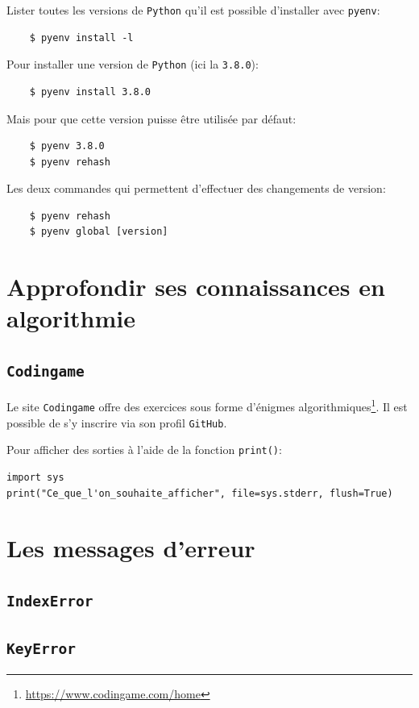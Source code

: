 \documentclass[a4paper,12pt]{book}
\begin{document}
Lister toutes les versions de \texttt{Python} qu'il est possible d'installer avec \texttt{pyenv}:
\begin{verbatim}
    $ pyenv install -l
\end{verbatim}
\medskip

Pour installer une version de \texttt{Python} (ici la \texttt{3.8.0}):
\begin{verbatim}
    $ pyenv install 3.8.0
\end{verbatim}
\medskip

Mais pour que cette version puisse être utilisée par défaut:
\begin{verbatim}
    $ pyenv 3.8.0
    $ pyenv rehash
\end{verbatim}
\medskip

Les deux commandes qui permettent d'effectuer des changements de version:
\begin{verbatim}
    $ pyenv rehash
    $ pyenv global [version]
\end{verbatim}
\medskip

\chapter{Approfondir ses connaissances en algorithmie}
\section{\texttt{Codingame}}
Le site \texttt{Codingame} offre des exercices sous forme d'énigmes algorithmiques\footnote{\url{https://www.codingame.com/home}}. Il est possible de s'y inscrire via son profil \texttt{GitHub}.
\medskip

Pour afficher des sorties à l'aide de la fonction \texttt{print()}:
\begin{lstlisting}
import sys
print("Ce_que_l'on_souhaite_afficher", file=sys.stderr, flush=True)
\end{lstlisting}
\medskip

\chapter{Les messages d'erreur}


\section{\texttt{IndexError}}
\section{\texttt{KeyError}}
\end{document}
